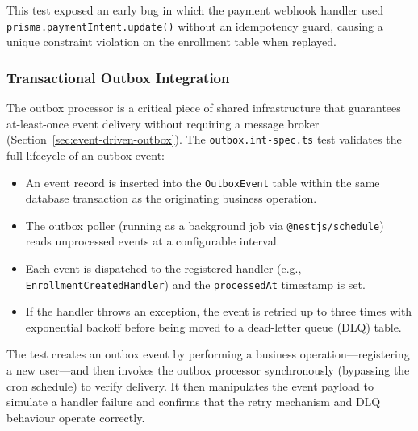 This test exposed an early bug in which the payment webhook handler used \texttt{prisma.paymentIntent.update()} without an idempotency guard, causing a unique constraint violation on the enrollment table when replayed.

\subsubsection{Transactional Outbox Integration}

The outbox processor is a critical piece of shared infrastructure that guarantees at-least-once event delivery without requiring a message broker (Section~\ref{sec:event-driven-outbox}). The \texttt{outbox.int-spec.ts} test validates the full lifecycle of an outbox event:

\begin{itemize}
  \item An event record is inserted into the \texttt{OutboxEvent} table within the same database transaction as the originating business operation.
  \item The outbox poller (running as a background job via \texttt{@nestjs/schedule}) reads unprocessed events at a configurable interval.
  \item Each event is dispatched to the registered handler (e.g., \texttt{EnrollmentCreatedHandler}) and the \texttt{processedAt} timestamp is set.
  \item If the handler throws an exception, the event is retried up to three times with exponential backoff before being moved to a dead-letter queue (DLQ) table.
\end{itemize}

The test creates an outbox event by performing a business operation---registering a new user---and then invokes the outbox processor synchronously (bypassing the cron schedule) to verify delivery. It then manipulates the event payload to simulate a handler failure and confirms that the retry mechanism and DLQ behaviour operate correctly.
